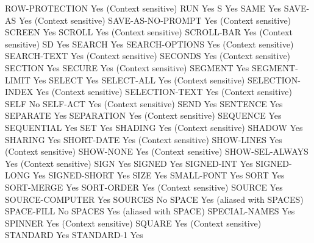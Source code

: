 ROW-PROTECTION                  Yes (Context sensitive)
RUN                             Yes
S                               Yes
SAME                            Yes
SAVE-AS                         Yes (Context sensitive)
SAVE-AS-NO-PROMPT               Yes (Context sensitive)
SCREEN                          Yes
SCROLL                          Yes (Context sensitive)
SCROLL-BAR                      Yes (Context sensitive)
SD                              Yes
SEARCH                          Yes
SEARCH-OPTIONS                  Yes (Context sensitive)
SEARCH-TEXT                     Yes (Context sensitive)
SECONDS                         Yes (Context sensitive)
SECTION                         Yes
SECURE                          Yes (Context sensitive)
SEGMENT                         Yes
SEGMENT-LIMIT                   Yes
SELECT                          Yes
SELECT-ALL                      Yes (Context sensitive)
SELECTION-INDEX                 Yes (Context sensitive)
SELECTION-TEXT                  Yes (Context sensitive)
SELF                            No
SELF-ACT                        Yes (Context sensitive)
SEND                            Yes
SENTENCE                        Yes
SEPARATE                        Yes
SEPARATION                      Yes (Context sensitive)
SEQUENCE                        Yes
SEQUENTIAL                      Yes
SET                             Yes
SHADING                         Yes (Context sensitive)
SHADOW                          Yes
SHARING                         Yes
SHORT-DATE                      Yes (Context sensitive)
SHOW-LINES                      Yes (Context sensitive)
SHOW-NONE                       Yes (Context sensitive)
SHOW-SEL-ALWAYS                 Yes (Context sensitive)
SIGN                            Yes
SIGNED                          Yes
SIGNED-INT                      Yes
SIGNED-LONG                     Yes
SIGNED-SHORT                    Yes
SIZE                            Yes
SMALL-FONT                      Yes
SORT                            Yes
SORT-MERGE                      Yes
SORT-ORDER                      Yes (Context sensitive)
SOURCE                          Yes
SOURCE-COMPUTER                 Yes
SOURCES                         No
SPACE                           Yes (aliased with SPACES)
SPACE-FILL                      No
SPACES                          Yes (aliased with SPACE)
SPECIAL-NAMES                   Yes
SPINNER                         Yes (Context sensitive)
SQUARE                          Yes (Context sensitive)
STANDARD                        Yes
STANDARD-1                      Yes
